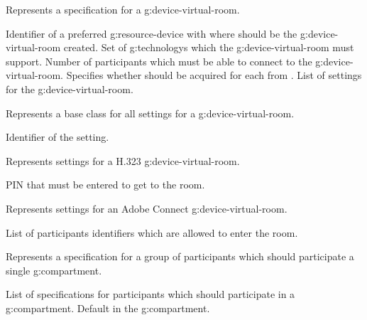 \begin{Api}
Represents a specification for a \gls{g:device-virtual-room}.
\begin{ApiClassAttributes}
 Identifier of a preferred \gls{g:resource-device} with  where should be the \gls{g:device-virtual-room} created.
 Set of \glspl{g:technology} which the \gls{g:device-virtual-room} must support.
 Number of participants which must be able to connect to the \gls{g:device-virtual-room}.
 Specifies whether  should be acquired for each  from .
 List of settings for the \gls{g:device-virtual-room}.
\end{ApiClassAttributes}

Represents a base class for all settings for a \gls{g:device-virtual-room}.
\begin{ApiClassAttributes}
 Identifier of the setting.
\end{ApiClassAttributes}

Represents settings for a H.323 \gls{g:device-virtual-room}.
\begin{ApiClassAttributes}
 PIN that must be entered to get to the room.
\end{ApiClassAttributes}

Represents settings for an Adobe Connect \gls{g:device-virtual-room}.
\begin{ApiClassAttributes}
 List of participants identifiers which are allowed to enter the room. \newline{}
\end{ApiClassAttributes}

Represents a specification for a group of participants which should participate a single \gls{g:compartment}.
\begin{ApiClassAttributes}
 List of specifications for participants which should participate in a \gls{g:compartment}.
 Default  in the \gls{g:compartment}.
\end{ApiClassAttributes}


\end{Api}
